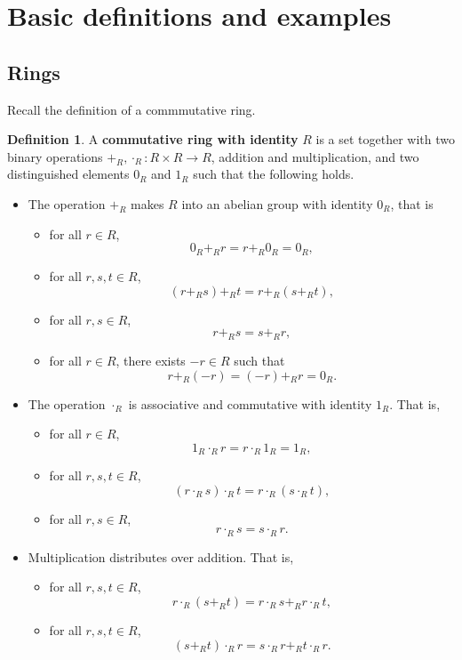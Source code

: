 \documentclass{article}
\newcommand{\rb}[1]{\left( #1 \right)}
\theoremstyle{definition}\newtheorem{definition}{Definition}[subsection]
\theoremstyle{definition}\newtheorem{remark}[definition]{Remark}
\theoremstyle{definition}\newtheorem*{example}{Example}
\theoremstyle{definition}\newtheorem*{note}{Note}
\begin{document}
\section{Basic definitions and examples}

\subsection{Rings}

Recall the definition of a commmutative ring.

\begin{definition}
A \textbf{commutative ring with identity} $ R $ is a set together with two binary operations $ +_R, \cdot_R : R \times R \to R $, addition and multiplication, and two distinguished elements $ 0_R $ and $ 1_R $ such that the following holds.
\begin{itemize}
\item The operation $ +_R $ makes $ R $ into an abelian group with identity $ 0_R $, that is
\begin{itemize}
\item for all $ r \in R $,
$$ 0_R +_R r = r +_R 0_R = 0_R, $$
\item for all $ r, s, t \in R $,
$$ \rb{r +_R s} +_R t = r +_R \rb{s +_R t}, $$
\item for all $ r, s \in R $,
$$ r +_R s = s +_R r, $$
\item for all $ r \in R $, there exists $ -r \in R $ such that
$$ r +_R \rb{-r} = \rb{-r} +_R r = 0_R. $$
\end{itemize}
\item The operation $ \cdot_R $ is associative and commutative with identity $ 1_R $. That is,
\begin{itemize}
\item for all $ r \in R $,
$$ 1_R \cdot_R r = r \cdot_R 1_R = 1_R, $$
\item for all $ r, s, t \in R $,
$$ \rb{r \cdot_R s} \cdot_R t = r \cdot_R \rb{s \cdot_R t}, $$
\item for all $ r, s \in R $,
$$ r \cdot_R s = s \cdot_R r. $$
\end{itemize}
\item Multiplication distributes over addition. That is,
\begin{itemize}
\item for all $ r, s, t \in R $,
$$ r \cdot_R \rb{s +_R t} = r \cdot_R s +_R r \cdot_R t, $$
\item for all $ r, s, t \in R $,
$$ \rb{s +_R t} \cdot_R r = s \cdot_R r +_R t \cdot_R r. $$
\end{itemize}
\end{itemize}
\end{definition}
\end{document}
